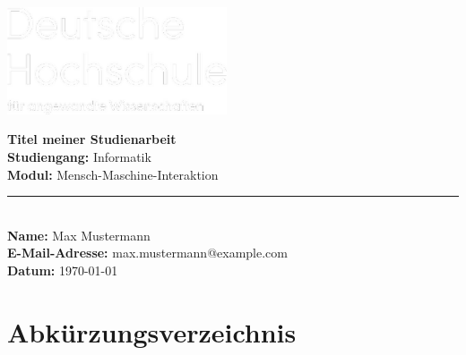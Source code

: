 \documentclass[a4paper,12pt]{report}
\makeatletter
\newcommand{\printAuthorName}{Max Mustermann}
\newcommand{\printAuthorMail}{max.mustermann@example.com}
\newcommand{\printDocumentTitle}{Titel meiner Studienarbeit}
\newcommand{\printDocumentSubject}{Mensch-Maschine-Interaktion}
\newcommand{\printCourseOfStudy}{Informatik}
\newcommand{\printDocumentDate}{\today}
\makeatother
\begin{document}
\begin{titlepage}
  \thispagestyle{empty} %
  \noindent
  \colorbox{dhaw_red}{
    \parbox[c][0.25\paperheight][c]{\paperwidth}{%
      \centering
      \vspace{1cm}
      \hspace*{-10.5cm}\includegraphics[height=3.17cm]{dhaw_logo.png}\\[2cm]
    }
  }

  \vspace{3cm}
  \noindent
  \hspace{2.5cm}
  \begin{minipage}{\dimexpr\paperwidth - 2.5cm - 2.5cm\relax}
    {\huge \textbf{\printDocumentTitle}}\\[1cm]
    \textbf{Studiengang:} \printCourseOfStudy\\
    \textbf{Modul:} \printDocumentSubject\\
    \rule{\textwidth}{1pt}\\
    \textbf{Name:} \printAuthorName\\
    \textbf{E-Mail-Adresse:} \printAuthorMail\\
    \textbf{Datum:} \printDocumentDate\\
  \end{minipage}
\end{titlepage}
\restoregeometry


\tableofcontents

\chapter*{Abkürzungsverzeichnis}

\listoffigures
{}

\listoftables
{}

\cleardoublepage
\end{document}
